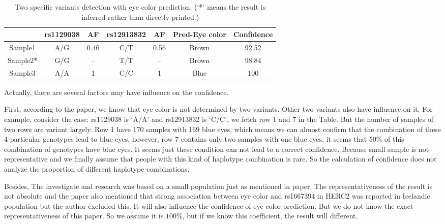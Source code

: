 \documentclass[a4paper]{article}
\begin{document}
\begin{table}[H]
	\small
	\centering
	\begin{tabular}{c|cc|cc|c|c}
		\hline
		& rs1129038 & AF & rs12913832 & AF & Pred-Eye color & Confidence\\	 
		\hline
		Sample1 & A/G  & 0.46 & C/T & 0.56 & Brown & 92.52 \\
		\hline
		Sample2* & G/G & -- & T/T & --  & Brown & 98.84 \\
		\hline
		Sample3 & A/A & 1 & C/C & 1 & Blue & 100 \\
		\hline
	\end{tabular}
	\caption{\label{tab:4}Two specific variants detection with eye color prediction. (`*' means the result is inferred rather than directly printed.)}
\end{table}

Actually, there are several factors may have influence on the confidence. 

First, according to the paper, we know that eye color is not determined by two variants. Other two variants also have influence on it. For example, consider the case: rs1129038 is `A/A' and rs12913832 is `C/C', we fetch row 1 and 7 in the Table. But the number of samples of two rows are variant largely. Row 1 have 170 samples with 169 blue eyes, which means we can almost confirm that the combination of these 4 particular genotypes lead to blue eyes, however, row 7 contains only two samples with one blue eyes, it seems that 50\% of this combination of genotypes have blue eyes. It seems just these condition can not lead to a correct confidence. Because small sample is not representative and we finally assume that people with this kind of haplotype combination is rare. So the calculation of confidence does not analyze the proportion of different haplotype combinations.

Besides, The investigate and research was based on a small population just as mentioned in paper. The representativeness of the result is not absolute and the paper also mentioned that strong association between eye color and rs1667394 in HERC2 was reported in Icelandic population but the author excluded this. It will also influence the confidence of eye color prediction. But we do not know the exact representativeness of this paper. So we assume it is $100\%$, but if we know this coefficient, the result will different.




\end{document}
